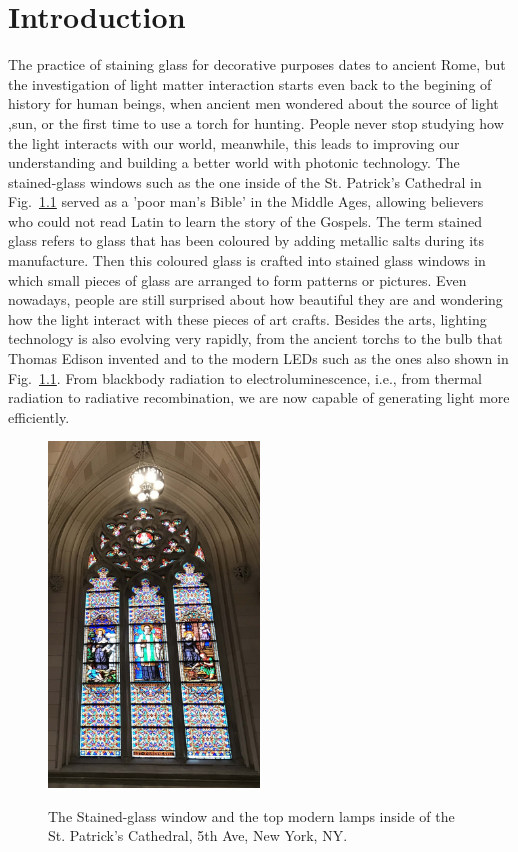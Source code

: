 \chapter{Introduction}

The practice of staining glass for decorative purposes dates to ancient Rome,
but the investigation of light matter interaction starts even back to the
begining of history for human beings, when ancient men wondered about the
source of light ,sun, or the first time to use a torch for hunting. People
never stop studying how the light interacts with our world, meanwhile, this
leads to improving our understanding and building a better world with photonic
technology. The stained-glass windows such as the one inside of the St.
Patrick's Cathedral in Fig.~\ref{StainGlass} served as a 'poor man's Bible' in
the Middle Ages, allowing believers who could not read Latin to learn the story
of the Gospels.  The term stained glass refers to glass that has been coloured
by adding metallic salts during its manufacture. Then this coloured glass is
crafted into stained glass windows in which small pieces of glass are arranged
to form patterns or pictures. Even nowadays, people are still surprised about
how beautiful they are and wondering how the light interact with these pieces
of art crafts. Besides the arts, lighting technology is also evolving very
rapidly, from the ancient torchs to the bulb that Thomas Edison invented and to
the modern LEDs such as the ones also shown in Fig.~\ref{StainGlass}. From
blackbody radiation to electroluminescence, i.e., from thermal radiation to
radiative recombination, we are now capable of generating light more
efficiently.

\begin{figure}
  \caption{The Stained-glass window and the top modern lamps inside of the St. Patrick's Cathedral, 5th Ave, New York, NY.}
  \centering
  \includegraphics[width=0.5\textwidth,height=0.5\textheight]{pictures/Introduction/StainGlass}
  \label{StainGlass}
\end{figure}

